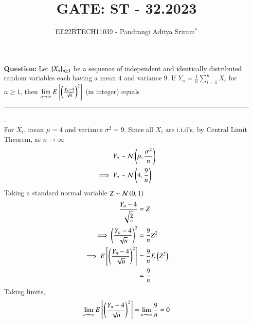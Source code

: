 \documentclass[journal,12pt,twocolumn]{IEEEtran}
\theoremstyle{remark}
\begin{document}

\vspace{3cm}

\title{GATE: ST - 32.2023}
\author{EE22BTECH11039 - Pandrangi Aditya Sriram$^{*}$%
}
\maketitle
\newpage
\bigskip

\renewcommand{\thefigure}{\theenumi}
\renewcommand{\thetable}{\theenumi}


\vspace{3cm}
\textbf{Question:} Let $\left\{X_n\right\}_{n \geq 1}$ be a sequence of independent and identically distributed random variables each having a mean $4$ and variance $9$. If $Y_n = \frac{1}{n} \sum_{i=1}^{n} X_i$ for $n \geq 1$, then $\lim\limits_{n \to \infty} E{}\left[\left(\frac{Y_n - 4}{\sqrt{n}}\right)^2\right]$ (in integer) equals \rule{2cm}{0.1mm}.
\\
\solution
For $X_i$, mean $\mu = 4$ and variance $\sigma^2 = 9$. Since all $X_i$ are i.i.d's, by Central Limit Theorem, as $n \rightarrow \infty$
\begin{align}
    Y_n &\sim \mathcal{N}\left(\mu, \frac{\sigma^2}{n}\right)\\
    \implies Y_n &\sim \mathcal{N}\left(4, \frac{9}{n}\right)
\end{align}
Taking a standard normal variable $Z \sim \mathcal{N}\left(0, 1\right)$
\begin{align}
    \frac{Y_n - 4}{\sqrt{\frac{9}{n}}} &= Z\\
    \implies \left(\frac{Y_n - 4}{\sqrt{n}}\right)^2 &= \frac{9}{n} Z^2\\
    \implies E{}\left[\left(\frac{Y_n - 4}{\sqrt{n}}\right)^2\right] &= \frac{9}{n} E\left(Z^2\right)\\
    &= \frac{9}{n}
\end{align}
Taking limits,
\begin{align}
    \lim\limits_{n \to \infty} E{}\left[\left(\frac{Y_n - 4}{\sqrt{n}}\right)^2\right]
    = \lim\limits_{n \to \infty} \frac{9}{n} = 0
\end{align}
\end{document}
